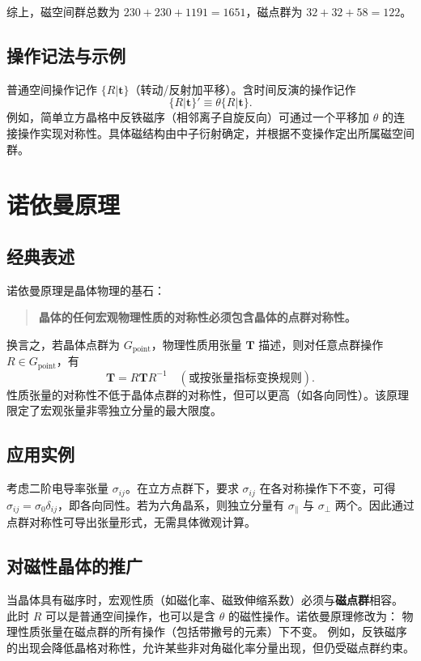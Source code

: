 综上，磁空间群总数为 $230 + 230 + 1191 = 1651$，磁点群为 $32 + 32 + 58 = 122$。

\subsection{操作记法与示例}
普通空间操作记作 $\{R|\mathbf{t}\}$（转动/反射加平移）。含时间反演的操作记作
\[
\{R|\mathbf{t}\}' \equiv \theta \{R|\mathbf{t}\}.
\]
例如，简单立方晶格中反铁磁序（相邻离子自旋反向）可通过一个平移加 $\theta$ 的连接操作实现对称性。具体磁结构由中子衍射确定，并根据不变操作定出所属磁空间群。

\section{诺依曼原理}

\subsection{经典表述}
诺依曼原理是晶体物理的基石：
\begin{quote}
\textbf{晶体的任何宏观物理性质的对称性必须包含晶体的点群对称性。}
\end{quote}
换言之，若晶体点群为 $G_{\text{point}}$，物理性质用张量 $\mathbf{T}$ 描述，则对任意点群操作 $R \in G_{\text{point}}$，有
\[
\mathbf{T} = R \mathbf{T} R^{-1}\quad (\text{或按张量指标变换规则}).
\]
性质张量的对称性不低于晶体点群的对称性，但可以更高（如各向同性）。该原理限定了宏观张量非零独立分量的最大限度。

\subsection{应用实例}
考虑二阶电导率张量 $\sigma_{ij}$。在立方点群下，要求 $\sigma_{ij}$ 在各对称操作下不变，可得 $\sigma_{ij} = \sigma_0 \delta_{ij}$，即各向同性。若为六角晶系，则独立分量有 $\sigma_{\parallel}$ 与 $\sigma_{\perp}$ 两个。因此通过点群对称性可导出张量形式，无需具体微观计算。

\subsection{对磁性晶体的推广}
当晶体具有磁序时，宏观性质（如磁化率、磁致伸缩系数）必须与\textbf{磁点群}相容。
此时 $R$ 可以是普通空间操作，也可以是含 $\theta$ 的磁性操作。诺依曼原理修改为：
物理性质张量在磁点群的所有操作（包括带撇号的元素）下不变。
例如，反铁磁序的出现会降低晶格对称性，允许某些非对角磁化率分量出现，但仍受磁点群约束。


